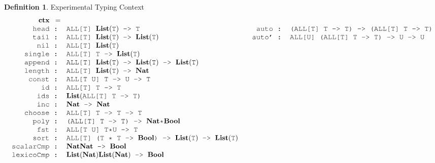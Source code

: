\documentclass[acmsmall]{acmart}
\theoremstyle{definition}
\newtheorem{definition}{Definition}[section]
\begin{document}
\begin{definition} Experimental Typing Context  
  \label{def:experimental_typing_context}
  \scriptsize
  \[
  \begin{array}[t]{ll}
    \begin{array}[t]{r@{}c@{}l}
      \textbf{ctx} & = &  \hfill
      \\
      \J{head} &\J{ : }& \J{ALL[T] }\textbf{List}(\J{T})\J{ -> T}
      \\
      \J{tail} &\J{ : }& \J{ALL[T] }\textbf{List}(\J{T})\J{ -> }\textbf{List}(\J{T})
      \\
      \J{nil} &\J{ : }& \J{ALL[T] }\textbf{List}(\J{T})
      \\
      \J{single} &\J{ : }& \J{ALL[T] T -> }\textbf{List}(\J{T})
      \\
      \J{append} &\J{ : }& \J{ALL[T] }\textbf{List}(\J{T}) \J{ -> } \textbf{List}(\J{T}) \J{ -> } \textbf{List}(\J{T})
      \\
      \J{length} &\J{ : }& \J{ALL[T] }\textbf{List}(\J{T}) \J{ -> } \textbf{Nat}
      \\
      \J{const} &\J{ : }& \J{ALL[T U] T -> U -> T}
      \\
      \J{id} &\J{ : }& \J{ALL[T] T -> T}
      \\
      \J{ids} &\J{ : }& \textbf{List}(\J{ALL[T] T -> T}\J{)}
      \\
      \J{inc} &\J{ : }& \textbf{Nat}\J{ -> }\textbf{Nat}
      \\
      \J{choose} &\J{ : }& \J{ALL[T] T -> T -> T}
      \\
      \J{poly} &\J{ : }& \J{(ALL[T] T -> T) -> } \textbf{Nat}\J{*}\textbf{Bool}
      \\
      \J{fst} &\J{ : }& \J{ALL[T U] T*U -> T}
      \\
      \J{sort} &\J{ : }& \J{ALL[T] (T * T -> } \textbf{Bool} \J{) -> }\textbf{List}(\J{T})\J{ -> }\textbf{List}(\J{T})
      \\
      \J{scalarCmp} &\J{ : }& \textbf{Nat} \J{\*} \textbf{Nat} \J{ -> } \textbf{Bool} 
      \\
      \J{lexicoCmp} &\J{ : }& \textbf{List}(\textbf{Nat}) \J{\*} \textbf{List}(\textbf{Nat}) \J{ -> } \textbf{Bool} 
    \end{array}
    &
    \begin{array}[t]{r@{}c@{}l}
      \\
      \J{auto} &\J{ : }& \J{(ALL[T] T -> T) -> (ALL[T] T -> T)}
      \\
      \J{auto'} &\J{ : }& \J{ALL[U] (ALL[T] T -> T) -> U -> U}

\end{array}
\end{array}\]
\end{definition}
\end{document}
